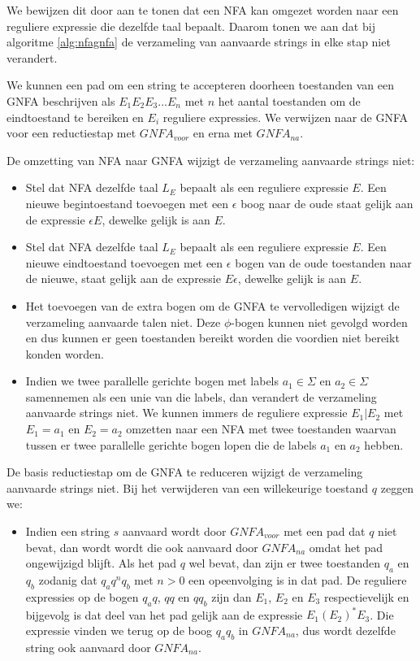   We bewijzen dit door aan te tonen dat een NFA kan omgezet worden naar een reguliere expressie die dezelfde taal bepaalt. Daarom tonen we aan dat bij algoritme \ref{alg:nfagnfa} de verzameling van aanvaarde strings in elke stap niet verandert.
  
  We kunnen een pad om een string te accepteren doorheen toestanden van een GNFA beschrijven als $E_1E_2E_3...E_n$ met $n$ het aantal toestanden om de eindtoestand te bereiken en $E_i$ reguliere expressies. We verwijzen naar de GNFA voor een reductiestap met $GNFA_{voor}$ en erna met $GNFA_{na}$.
  \begin{enumalgo}
  \item De omzetting van NFA naar GNFA wijzigt de verzameling aanvaarde strings niet:
  \begin{itemize}
  \item Stel dat NFA dezelfde taal $L_E$ bepaalt als een reguliere expressie $E$. Een nieuwe begintoestand toevoegen met een $\epsilon$ boog naar de oude staat gelijk aan de expressie $\epsilon E$, dewelke gelijk is aan $E$.
  \item Stel dat NFA dezelfde taal $L_E$ bepaalt als een reguliere expressie $E$. Een nieuwe eindtoestand toevoegen met een $\epsilon$ bogen van de oude toestanden naar de nieuwe, staat gelijk aan de expressie $E\epsilon$, dewelke gelijk is aan $E$.
  \item Het toevoegen van de extra bogen om de GNFA te vervolledigen wijzigt de verzameling aanvaarde talen niet. Deze $\phi$-bogen kunnen niet gevolgd worden en dus kunnen er geen toestanden bereikt worden die voordien niet bereikt konden worden.
  \item Indien we twee parallelle gerichte bogen met labels $a_1 \in \Sigma$ en $a_2 \in \Sigma$ samennemen als een unie van die labels, dan verandert de verzameling aanvaarde strings niet. We kunnen immers de reguliere expressie $E_1|E_2$ met $E_1 = a_1$ en $E_2 = a_2$ omzetten naar een NFA met twee toestanden waarvan tussen er twee parallelle gerichte bogen lopen die de labels $a_1$ en $a_2$ hebben.
  \end{itemize}
  \item De basis reductiestap om de GNFA te reduceren wijzigt de verzameling aanvaarde strings niet. Bij het verwijderen van een willekeurige toestand $q$ zeggen we:
  \begin{itemize}
  \item Indien een string $s$ aanvaard wordt door $GNFA_{voor}$ met een pad dat $q$ niet bevat, dan wordt wordt die ook aanvaard door $GNFA_{na}$ omdat het pad ongewijzigd blijft. Als het pad $q$ wel bevat, dan zijn er twee toestanden $q_a$ en $q_b$ zodanig dat $q_aq^nq_b$ met $n > 0$ een opeenvolging is in dat pad. De reguliere expressies op de bogen $q_aq$, $qq$ en $qq_b$ zijn dan $E_1$, $E_2$ en $E_3$ respectievelijk en bijgevolg is dat deel van het pad gelijk aan de expressie $E_1(E_2)^*E_3$. Die expressie vinden we terug op de boog $q_aq_b$ in $GNFA_{na}$, dus wordt dezelfde string ook aanvaard door $GNFA_{na}$.

\end{itemize}
\end{enumalgo}
